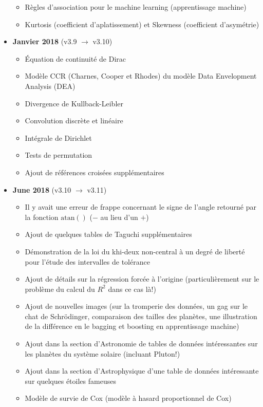 \begin{itemize}
\begin{itemize}[noitemsep]
				\item Règles d'association pour le machine learning (apprentissage machine)
				\item Kurtosis (coefficient d'aplatissement) et Skewness (coefficient d'asymétrie)
			\end{itemize}
		\item \textbf{Janvier 2018} (v3.9 $\rightarrow$ v3.10)
			\begin{itemize}[noitemsep]
				\item Équation de continuité de Dirac
				\item Modèle CCR (Charnes, Cooper et Rhodes) du modèle Data Envelopment Analysis (DEA)
				\item Divergence de Kullback-Leibler
				\item Convolution discrète et linéaire
				\item Intégrale de Dirichlet
				\item Tests de permutation
				\item Ajout de références croisées supplémentaires
			\end{itemize}
			\item \textbf{June 2018} (v3.10 $\rightarrow$ v3.11)
			\begin{itemize}[noitemsep]
				\item Il y avait une erreur de frappe concernant le signe de l'angle retourné par la fonction $\mathrm{atan()}$ ($-$ au lieu d'un $+$)
				\item Ajout de quelques tables de Taguchi supplémentaires
				\item Démonstration de la loi du khi-deux non-central à un degré de liberté pour l'étude des intervalles de tolérance
				\item Ajout de détails sur la régression forcée à l'origine (particulièrement sur le problème du calcul du $R^2$ dans ce cas là!)
				\item Ajout de nouvelles images (sur la tromperie des données, un gag sur le chat de Schrödinger, comparaison des tailles des planètes, une illustration de la différence en le bagging et boosting en apprentissage machine)
				\item Ajout dans la section d'Astronomie de tables de données intéressantes sur les planètes du système solaire (incluant Pluton!)
				\item Ajout dans la section d'Astrophysique d'une table de données intéressante sur quelques étoiles fameuses
				\item Modèle de survie de Cox (modèle à hasard proportionnel de Cox)

\end{itemize}
\end{itemize}
